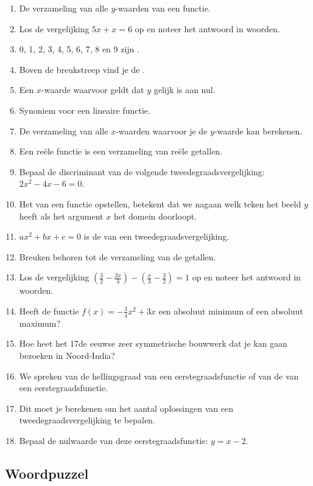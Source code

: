 \documentclass[12pt]{article}
\begin{document}
\begin{theorie}
\begin{enumerate}
  \item De verzameling van alle $y$-waarden van een functie.
  \item Los de vergelijking $5x+x=6$ op en noteer het antwoord in woorden.
  \item 0, 1, 2, 3, 4, 5, 6, 7, 8 en 9 zijn \arule{4cm}.
  \item Boven de breukstreep vind je de \arule{4cm}.
  \item Een $x$-waarde waarvoor geldt dat $y$ gelijk is aan nul.
  \item Synoniem voor een lineaire functie.
  \item De verzameling van alle $x$-waarden waarvoor je de $y$-waarde kan berekenen.
  \item Een reële functie is een verzameling van \arule{4cm} reële getallen.
  \item Bepaal de discriminant van de volgende tweedegraadsvergelijking: $2x^2-4x-6=0$.
  \item Het \arule{4cm} van een functie opstellen, betekent dat we nagaan welk teken het beeld $y$ heeft als het argument $x$ het domein doorloopt.
  \item $ax^2+bx+c=0$ is de \arule{4cm} van een tweedegraadsvergelijking.
  \item Breuken behoren tot de verzameling van de \arule{4cm} getallen.
  \item Los de vergelijking $\left(\frac{3}{2}-\frac{2x}{3}\right)-\left(\frac{x}{3}-\frac{3}{2}\right)=1$ op en noteer het antwoord in woorden.
  \item Heeft de functie $f(x)=-\frac{3}{4}x^2+3x$ een absoluut minimum of een absoluut maximum?
  \item Hoe heet het 17de eeuwse zeer symmetrische bouwwerk dat je kan gaan bezoeken in Noord-India?
  \item We spreken van de hellingsgraad van een eerstegraadsfunctie of van de \arule{3cm} van een eerstegraadsfunctie.
  \item Dit moet je berekenen om het aantal oplossingen van een tweedegraadsvergelijking te bepalen.
  \item Bepaal de nulwaarde van deze eerstegraadsfunctie: $y=x-2$.
\end{enumerate}

\subsection*{Woordpuzzel}


\end{theorie}
\end{document}

